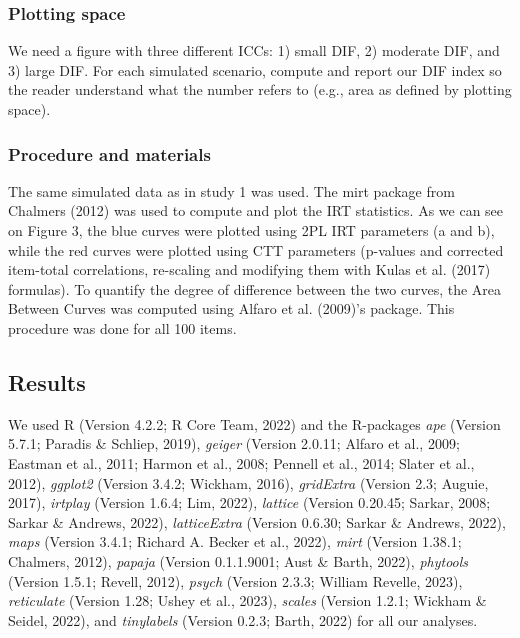 \documentclass[
  man]{apa6}
\begin{document}
\hypertarget{plotting-space}{%
\subsubsection{Plotting space}\label{plotting-space}}

We need a figure with three different ICCs: 1) small DIF, 2) moderate DIF, and 3) large DIF. For each simulated scenario, compute and report our DIF index so the reader understand what the number refers to (e.g., area as defined by plotting space).

\hypertarget{procedure-and-materials}{%
\subsubsection{Procedure and materials}\label{procedure-and-materials}}

The same simulated data as in study 1 was used. The mirt package from Chalmers (2012) was used to compute and plot the IRT statistics. As we can see on Figure 3, the blue curves were plotted using 2PL IRT parameters (a and b), while the red curves were plotted using CTT parameters (p-values and corrected item-total correlations, re-scaling and modifying them with Kulas et al. (2017) formulas). To quantify the degree of difference between the two curves, the Area Between Curves was computed using Alfaro et al. (2009)'s package. This procedure was done for all 100 items.

\hypertarget{results-1}{%
\subsection{Results}\label{results-1}}

We used R (Version 4.2.2; R Core Team, 2022) and the R-packages \emph{ape} (Version 5.7.1; Paradis \& Schliep, 2019), \emph{geiger} (Version 2.0.11; Alfaro et al., 2009; Eastman et al., 2011; Harmon et al., 2008; Pennell et al., 2014; Slater et al., 2012), \emph{ggplot2} (Version 3.4.2; Wickham, 2016), \emph{gridExtra} (Version 2.3; Auguie, 2017), \emph{irtplay} (Version 1.6.4; Lim, 2022), \emph{lattice} (Version 0.20.45; Sarkar, 2008; Sarkar \& Andrews, 2022), \emph{latticeExtra} (Version 0.6.30; Sarkar \& Andrews, 2022), \emph{maps} (Version 3.4.1; Richard A. Becker et al., 2022), \emph{mirt} (Version 1.38.1; Chalmers, 2012), \emph{papaja} (Version 0.1.1.9001; Aust \& Barth, 2022), \emph{phytools} (Version 1.5.1; Revell, 2012), \emph{psych} (Version 2.3.3; William Revelle, 2023), \emph{reticulate} (Version 1.28; Ushey et al., 2023), \emph{scales} (Version 1.2.1; Wickham \& Seidel, 2022), and \emph{tinylabels} (Version 0.2.3; Barth, 2022) for all our analyses.
\end{document}
